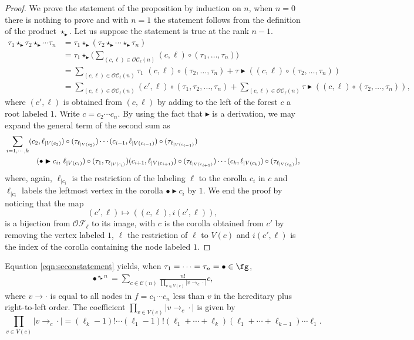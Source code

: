 \documentclass[12pt]{article}
\newcommand{\btr}{\blacktriangleright}
\begin{document}
\begin{proof} We prove the statement of the proposition by induction on $n$, when $n=0$ there is nothing to prove and with $n=1$ the statement follows from the definition of the product $\star_{\btr}$. Let us suppose the statement is true at the rank $n-1$.
\begin{align}
\tau_1 \star_{\btr} \tau_2\star_{\btr} \cdots \tau_{n} &= 
\tau_1 \star_{\btr} (\tau_2 \star_{\btr} \cdots \star_{\btr}\tau_{n}) \\
& = \tau_1 \star_{\btr} \Big( \sum_{(c,\ell) \in \mathcal{O}\mathcal{C}_{\ell}(n)} {(c,\ell)}\circ (\tau_1, \ldots, \tau_n) \Big) \\
& = \sum_{(c,\ell) \in \mathcal{O}\mathcal{C}_{\ell}(n)} \tau_1 \,\,{(c,\ell)}\circ (\tau_2, \ldots, \tau_n) + \tau \btr ({(c,\ell)}\circ (\tau_2, \ldots, \tau_n)) \\
& = \sum_{(c,\ell) \in \mathcal{O}\mathcal{C}_{\ell}(n)} {(c',\ell)}\circ (\tau_1,\tau_2, \ldots, \tau_n) + \sum_{(c,\ell) \in \mathcal{O}\mathcal{C}_{\ell}(n)} \tau \btr ({(c,\ell)}\circ (\tau_2, \ldots, \tau_n)),
\end{align}
where $(c',\ell)$ is obtained from $(c,\ell)$ by adding to the left of the forest $c$ a root labeled $1$. Write $c = c_2\cdots c_n$. By using the fact that $\btr$ is a derivation, we may expand the general term of the second sum as 
\begin{align}
&\sum_{i=1,\cdots, k} (c_2, \ell_{|V({c_2})})\circ (\tau_{\ell_{|V(c_2)}})\cdots (c_{i-1}, \ell_{|{V(c_{i-1})}})\circ (\tau_{\ell_{|V(c_{i-1})}}) \\ 
&\hspace{1.5cm}(\bullet \btr c_i,\,\ell_{|V(c_i)}) \circ (\tau_1,\tau_{\ell_{|V(c_i)}}) (c_{i+1}, \ell_{|V({c_{i+1}})}) \circ (\tau_{\ell_{|V(c_{i+1})}})\cdots  (c_{k}, \ell_{|V({c_{k})}}) \circ (\tau_{\ell_{|V(c_k)}}),
\end{align}
where, again, $\ell_{|c_i}$ is the restriction of the labeling $\ell$ to the corolla $c_i$ in $c$ and $\ell_{|c_i}$ labels the leftmost vertex in the corolla $\bullet \btr c_i$ by $1$.
 We end the proof by noticing that the map
 $$
(c',\ell) \mapsto ((c,\ell), i(c',\ell)),
 $$
is a bijection from $\mathcal{O}\mathcal{F}_{\ell}$ to its image, with $c$ is the corolla obtained from $c'$ by removing the vertex labeled $1$, $\ell$ the restriction of $\ell$ to $V(c)$ and $i(c',\ell)$ is the index of the corolla containing the node labeled $1$.
\end{proof}
Equation \eqref{eqn:seconstatement} yields, when $\tau_1 =\cdots = \tau_n = \bullet \in \fg $,
\begin{align*}
\bullet^{\star_{\btr} n} = \sum_{c \in  \mathcal{C}(n)} \frac{n!}{\prod_{v \in V(c)} | v \to_c \cdot| } c,
\end{align*}
where $v \to \cdot$ is equal to all nodes in $f=c_1 \cdots c_n$ less than $v$ in the hereditary plus right-to-left order. 
The coefficient ${\prod_{v \in V(c)} | v \to_c \cdot| }$ is given by
$$
{\prod_{v \in V(c)} | v \to_c \cdot| } = (\ell_k-1)! \cdots (\ell_1-1)!(\ell_1+\cdots+\ell_k)(\ell_1+\cdots+\ell_{k-1})\cdots \ell_1.
$$
\end{document}
